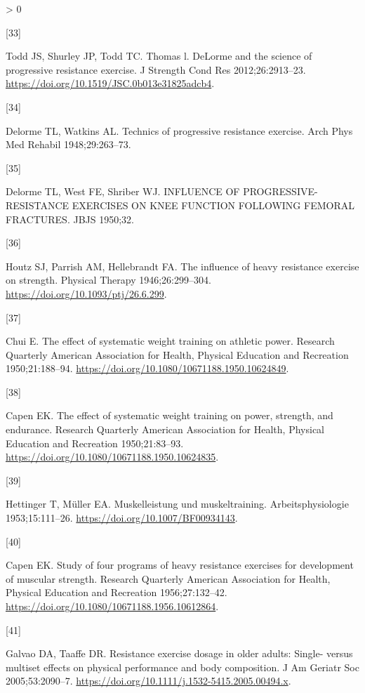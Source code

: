 \documentclass[twoside,10pt]{gihclass} %
\newlength{\cslhangindent}
\newlength{\csllabelwidth}
\newenvironment{CSLReferences}[3] %
 {%
  \setlength{\parindent}{0pt}
  \ifodd #1 \everypar{\setlength{\hangindent}{\cslhangindent}}\ignorespaces\fi
  \ifnum #2 > 0
  \setlength{\parskip}{#2\baselineskip}
  \fi
 }%
 {}
\newcommand{\CSLLeftMargin}[1]{\parbox[t]{\maxof{\widthof{#1}}{\csllabelwidth}}{#1}}
\newcommand{\CSLRightInline}[1]{\parbox[t]{\linewidth}{#1}}
\begin{document}
\begin{CSLReferences}{0}{0}
\leavevmode\hypertarget{ref-RN2639}{}%
\CSLLeftMargin{{[}33{]} }
\CSLRightInline{Todd JS, Shurley JP, Todd TC. Thomas l. DeLorme and the science of progressive resistance exercise. J Strength Cond Res 2012;26:2913--23. \url{https://doi.org/10.1519/JSC.0b013e31825adcb4}.}

\leavevmode\hypertarget{ref-RN2641}{}%
\CSLLeftMargin{{[}34{]} }
\CSLRightInline{Delorme TL, Watkins AL. Technics of progressive resistance exercise. Arch Phys Med Rehabil 1948;29:263--73.}

\leavevmode\hypertarget{ref-RN2646}{}%
\CSLLeftMargin{{[}35{]} }
\CSLRightInline{Delorme TL, West FE, Shriber WJ. INFLUENCE OF PROGRESSIVE-RESISTANCE EXERCISES ON KNEE FUNCTION FOLLOWING FEMORAL FRACTURES. JBJS 1950;32.}

\leavevmode\hypertarget{ref-RN2632}{}%
\CSLLeftMargin{{[}36{]} }
\CSLRightInline{Houtz SJ, Parrish AM, Hellebrandt FA. The influence of heavy resistance exercise on strength. Physical Therapy 1946;26:299--304. \url{https://doi.org/10.1093/ptj/26.6.299}.}

\leavevmode\hypertarget{ref-RN2644}{}%
\CSLLeftMargin{{[}37{]} }
\CSLRightInline{Chui E. The effect of systematic weight training on athletic power. Research Quarterly American Association for Health, Physical Education and Recreation 1950;21:188--94. \url{https://doi.org/10.1080/10671188.1950.10624849}.}

\leavevmode\hypertarget{ref-RN2642}{}%
\CSLLeftMargin{{[}38{]} }
\CSLRightInline{Capen EK. The effect of systematic weight training on power, strength, and endurance. Research Quarterly American Association for Health, Physical Education and Recreation 1950;21:83--93. \url{https://doi.org/10.1080/10671188.1950.10624835}.}

\leavevmode\hypertarget{ref-RN2645}{}%
\CSLLeftMargin{{[}39{]} }
\CSLRightInline{Hettinger T, Müller EA. Muskelleistung und muskeltraining. Arbeitsphysiologie 1953;15:111--26. \url{https://doi.org/10.1007/BF00934143}.}

\leavevmode\hypertarget{ref-RN1477}{}%
\CSLLeftMargin{{[}40{]} }
\CSLRightInline{Capen EK. Study of four programs of heavy resistance exercises for development of muscular strength. Research Quarterly American Association for Health, Physical Education and Recreation 1956;27:132--42. \url{https://doi.org/10.1080/10671188.1956.10612864}.}

\leavevmode\hypertarget{ref-RN1472}{}%
\CSLLeftMargin{{[}41{]} }
\CSLRightInline{Galvao DA, Taaffe DR. Resistance exercise dosage in older adults: Single- versus multiset effects on physical performance and body composition. J Am Geriatr Soc 2005;53:2090--7. \url{https://doi.org/10.1111/j.1532-5415.2005.00494.x}.}


\end{CSLReferences}
\end{document}
